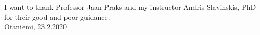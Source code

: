 \begin{abstractpage}[english]
	\abstracttext{}
\end{abstractpage}

I want to thank Professor Jaan Praks and my instructor Andris Slavinskis, PhD for 
their good and poor guidance.\\

\vspace{5cm}
Otaniemi, 23.2.2020

\vspace{5mm}
{\hfill \ThesisAuthor \hspace{1cm}}

\newpage


\thesistableofcontents



\printnoidxglossary[type=symbolslist, style=long]

\printnoidxglossary[type=operatorslist, style=long]

\printnoidxglossary[type=\acronymtype, style=long, title={Abbreviations}] 

\cleardoublepage



\thispagestyle{empty}


\clearpage


\clearpage



\clearpage



\clearpage


\clearpage



